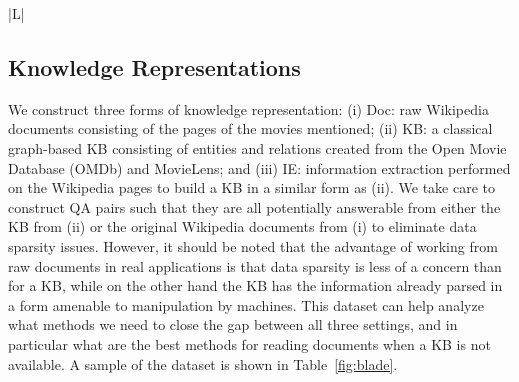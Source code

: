\begin{table}[t]
\begin{small}
\begin{center}
{{\begin{tabular}{|L|}
\hline
\end{tabular}
}}
\caption{
\label{fig:blade}
{\bf \WikiMovies}: Questions, Doc, KB and IE sources.}
\end{center}
\end{small}
\vspace{-1ex}
\end{table}






\subsection{Knowledge Representations} \label{sec:kr}

We construct three forms of knowledge representation:
(i) Doc: raw Wikipedia documents consisting of the pages of the movies mentioned;
(ii) KB: a classical graph-based KB consisting of entities
and relations created from the Open Movie Database (OMDb) and MovieLens;
and (iii) IE: information extraction performed on the Wikipedia pages to
build a KB in a similar form as (ii).
We take care to construct QA pairs such that they are all potentially answerable
from either the KB from (ii) or the original  Wikipedia documents from (i) to
eliminate data sparsity issues. However, it should
 be noted that the advantage of working from raw documents in real applications
is that data sparsity is less of a concern than for a KB, while on the other hand the KB
has the information already parsed in a form amenable to manipulation by machines.
This dataset can help analyze what  methods we need
to close the gap between all three settings, and in particular what
are the best methods for reading documents when a KB is not available.
A sample of the dataset is shown in Table~\ref{fig:blade}.

